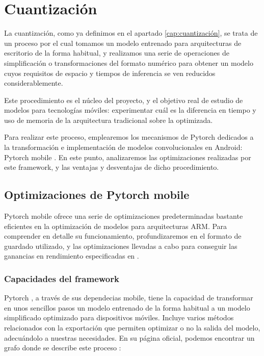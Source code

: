 \chapter{Cuantización}

La cuantización, como ya definimos en el apartado \ref{cap:cuantización}, se trata de un proceso por el cual tomamos un modelo entrenado para arquitecturas de escritorio de la forma habitual, y realizamos una serie de operaciones de simplificación o transformaciones del formato numérico para obtener un modelo cuyos requisitos de espacio y tiempos de inferencia se ven reducidos considerablemente. 

Este procedimiento es el núcleo del proyecto, y el objetivo real de estudio de modelos para tecnologías móviles: experimentar cuál es la diferencia en tiempo y uso de memoria de la arquitectura tradicional sobre la optimizada.

Para realizar este proceso, emplearemos los mecanismos de Pytorch\cite{paszke2019pytorch} dedicados a la transformación e implementación de modelos convolucionales en Android: Pytorch mobile  \cite{pmobile}. En este punto, analizaremos las optimizaciones realizadas por este framework, y las ventajas y desventajas de dicho procedimiento.

\section{Optimizaciones de Pytorch mobile}

Pytorch mobile ofrece una serie de optimizaciones predeterminadas bastante eficientes en la optimización de modelos para arquitecturas ARM. Para comprender en detalle su funcionamiento, profundizaremos en el formato de guardado utilizado, y las optimizaciones llevadas a cabo para conseguir las ganancias en rendimiento especificadas en \cite{pmobile}.

\subsection{Capacidades del framework}
Pytorch \cite{paszke2019pytorch}, a través de sus dependecias mobile, tiene la capacidad de transformar en unos sencillos pasos un modelo entrenado de la forma habitual a un modelo simplificado optimizado para dispositivos móviles. Incluye varios métodos relacionados con la exportación que permiten optimizar o no la salida del modelo, adecuándolo a nuestras necesidades. En su página oficial, podemos encontrar un grafo donde se describe este proceso \cite{pmobile}:

